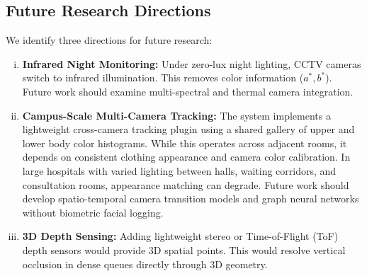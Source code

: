 \subsection{Future Research Directions}
We identify three directions for future research:
\begin{enumerate}[(i)]
    \item \textbf{Infrared Night Monitoring:} Under zero-lux night lighting, CCTV cameras switch to infrared illumination. This removes color information ($a^*, b^*$). Future work should examine multi-spectral and thermal camera integration.
    \item \textbf{Campus-Scale Multi-Camera Tracking:} The system implements a lightweight cross-camera tracking plugin using a shared gallery of upper and lower body color histograms. While this operates across adjacent rooms, it depends on consistent clothing appearance and camera color calibration. In large hospitals with varied lighting between halls, waiting corridors, and consultation rooms, appearance matching can degrade. Future work should develop spatio-temporal camera transition models and graph neural networks without biometric facial logging.
    \item \textbf{3D Depth Sensing:} Adding lightweight stereo or Time-of-Flight (ToF) depth sensors would provide 3D spatial points. This would resolve vertical occlusion in dense queues directly through 3D geometry.
\end{enumerate}
